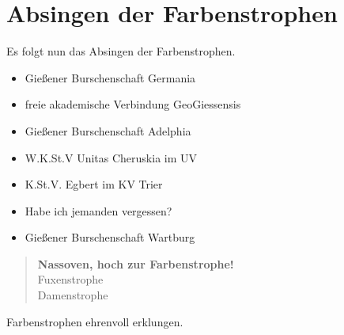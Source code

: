 \newpage
\section{Absingen der Farbenstrophen}
Es folgt nun das Absingen der Farbenstrophen.\\
\begin{itemize}
    \item Gießener Burschenschaft Germania
    \item freie akademische Verbindung GeoGiessensis
    \item Gießener Burschenschaft Adelphia
    \item W.K.St.V Unitas Cheruskia im UV
    \item K.St.V. Egbert im KV Trier
    \item Habe ich jemanden vergessen?
    \item Gießener Burschenschaft Wartburg
\end{itemize}

\begin{quote}
    \textbf{Nassoven, hoch zur Farbenstrophe!}\\
    Fuxenstrophe\\
    Damenstrophe\\
\end{quote}
Farbenstrophen ehrenvoll erklungen.